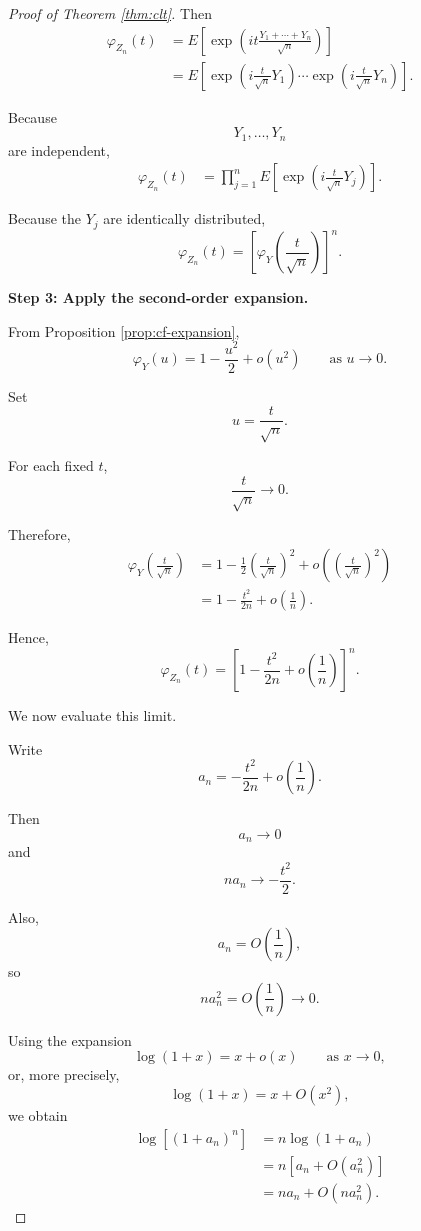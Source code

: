 \documentclass[11pt]{article}
\theoremstyle{definition}
\theoremstyle{plain}
\theoremstyle{remark}
\begin{document}
\begin{proof}[Proof of Theorem \ref{thm:clt}]
Then
\begin{align*}
\varphi_{Z_n}(t)
&=
E\left[
\exp\left(
it\frac{Y_1+\cdots+Y_n}{\sqrt{n}}
\right)
\right]
\\
&=
E\left[
\exp\left(
i\frac{t}{\sqrt{n}}Y_1
\right)
\cdots
\exp\left(
i\frac{t}{\sqrt{n}}Y_n
\right)
\right].
\end{align*}

Because
\[
Y_1,\ldots,Y_n
\]
are independent,
\begin{align*}
\varphi_{Z_n}(t)
&=
\prod_{j=1}^n
E\left[
\exp\left(
i\frac{t}{\sqrt{n}}Y_j
\right)
\right].
\end{align*}

Because the $Y_j$ are identically distributed,
\[
\varphi_{Z_n}(t)
=
\left[
\varphi_Y
\left(
\frac{t}{\sqrt{n}}
\right)
\right]^n.
\]

\medskip

\noindent
\textbf{Step 3: Apply the second-order expansion.}

From Proposition \ref{prop:cf-expansion},
\[
\varphi_Y(u)
=
1-\frac{u^2}{2}+o(u^2)
\qquad
\text{as }u\to0.
\]

Set
\[
u=\frac{t}{\sqrt{n}}.
\]

For each fixed $t$,
\[
\frac{t}{\sqrt{n}}\to0.
\]

Therefore,
\begin{align*}
\varphi_Y\left(\frac{t}{\sqrt{n}}\right)
&=
1
-
\frac{1}{2}
\left(\frac{t}{\sqrt{n}}\right)^2
+
o\left(
\left(\frac{t}{\sqrt{n}}\right)^2
\right)
\\
&=
1-\frac{t^2}{2n}
+
o\left(\frac{1}{n}\right).
\end{align*}

Hence,
\[
\varphi_{Z_n}(t)
=
\left[
1-\frac{t^2}{2n}
+
o\left(\frac{1}{n}\right)
\right]^n.
\]

We now evaluate this limit.

Write
\[
a_n
=
-\frac{t^2}{2n}
+
o\left(\frac{1}{n}\right).
\]

Then
\[
a_n\to0
\]
and
\[
na_n\to-\frac{t^2}{2}.
\]

Also,
\[
a_n=O\left(\frac{1}{n}\right),
\]
so
\[
na_n^2
=
O\left(\frac{1}{n}\right)
\to0.
\]

Using the expansion
\[
\log(1+x)
=
x+o(x)
\qquad
\text{as }x\to0,
\]
or, more precisely,
\[
\log(1+x)
=
x+O(x^2),
\]
we obtain
\begin{align*}
\log\left[(1+a_n)^n\right]
&=
n\log(1+a_n)
\\
&=
n\left[a_n+O(a_n^2)\right]
\\
&=
na_n+O(na_n^2).
\end{align*}


\end{proof}
\end{document}
